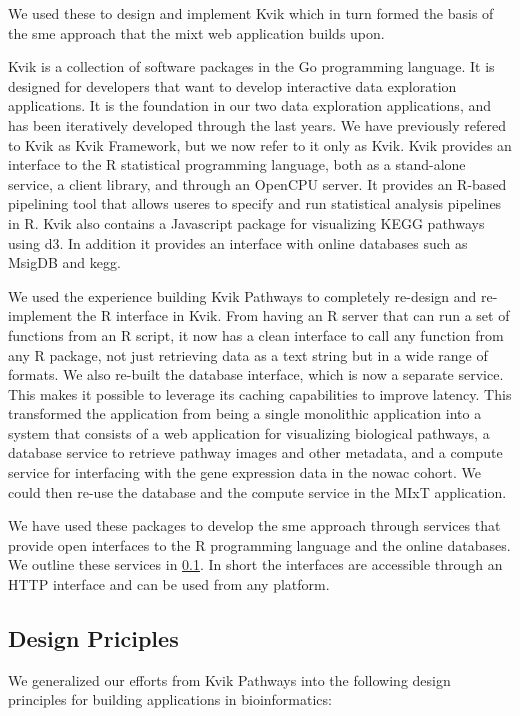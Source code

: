 We used these to design and implement Kvik which in turn formed the basis of  
the \gls{sme} approach that the \gls{mixt} web application builds upon. 

Kvik is a collection of software packages in the Go programming language. It is
designed for developers that want to develop interactive data exploration
applications. It is the foundation in our two data exploration applications, and
has been iteratively developed through the last years. We have previously
refered to Kvik as Kvik Framework\cite{fjukstad2015kvik}, but we now refer to it
only as Kvik.  Kvik provides an interface to the R statistical programming
language, both as a stand-alone service, a client library, and through an
OpenCPU server. It provides an R-based pipelining tool that allows useres to
specify and run statistical analysis pipelines in R.  Kvik also contains a
Javascript package for visualizing KEGG pathways using d3.\cite{d3}  In addition
it provides an interface with online databases such as MsigDB\cite{msigdb} and
\gls{kegg}\cite{kegg}.

We used the experience building Kvik Pathways to completely re-design and
re-implement the R interface in Kvik. From having an R server that can run a
set of functions from an R script, it now has a clean interface to call any
function from any R package, not just retrieving data as a text string but in a
wide range of formats. We also re-built the database interface, which is now a
separate service. This makes it possible to leverage its caching capabilities
to improve latency. This transformed the application from being a single
monolithic application into a system that consists of a web application for
visualizing biological pathways, a database service to retrieve pathway images
and other metadata, and a compute service for interfacing with the gene
expression data in the \gls{nowac} cohort. We could then re-use the database and the
compute service in the MIxT application. 

We have used these packages to develop the \gls{sme} approach through services
that provide open interfaces to the R programming language and the online
databases.  We outline these services in \ref{micrservices}.  In short the
interfaces are accessible through an HTTP interface and can be used from any
platform.

\subsection{Design Priciples}\label{micrservices} 
We generalized our efforts from Kvik Pathways into the following design
principles for building applications in bioinformatics: 

